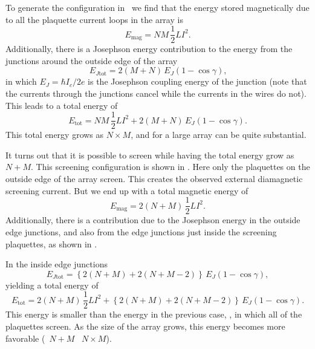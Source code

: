 %
%

To generate the configuration in
\ we find that the energy stored
magnetically due to all the plaquette current loops in the array 
is
%
\begin{equation}
E_{\mathrm{mag}} = NM\, \frac{1}{2} LI^2.
\end{equation}
%
Additionally, there is a Josephson energy contribution to the energy
from the junctions around the outside edge of the array
%
\begin{equation}
E_{J \mathrm{tot}} = 2(M+N)\, E_J (1-\cos\gamma)\mbox{,}
\end{equation}
%
in which $E_J=\hbar I_c/2 e$ is the Josephson coupling energy of the junction
(note that the currents through the junctions cancel while the currents in
the wires do not).
This leads to a total energy of 
%
\begin{equation}
E_{\mathrm{tot}} =  NM \,\frac{1}{2} LI^2 + 
          2(M+N)\, E_J (1-\cos\gamma).
\label{eqn:all_loop_screening}
\end{equation}
%
This total energy grows as $N\times M$, and for a large array can be quite 
substantial. 

It turns out that it is possible to screen while having the total
energy grow as $N+M$. 
This screening configuration is shown in 
. Here only the plaquettes on 
the outside edge of the array screen. This creates the observed external
diamagnetic screening current. But we end up with a total magnetic
energy of 
%
\begin{equation}
E_{\mathrm{mag}} = 2(N+M)\, \frac{1}{2} LI^2.
\end{equation}
% 
Additionally, there is a contribution due to the Josephson energy
in the outside edge junctions, and also from the edge 
junctions just inside the screening plaquettes, as shown in 
. 

In the inside edge junctions
%
\begin{equation}
E_{J \mathrm{tot}} 
=\left\{ 2(N+M) + 2(N + M - 2) \right\}\, E_J (1-\cos\gamma),
\end{equation}
%
yielding a total energy of 
%
\begin{equation}
E_{\mathrm{tot}} = 2(N+M)\, \frac{1}{2} LI^2 +
 \left\{ 2(N+M) + 2(N + M - 2) \right\}\, E_J (1-\cos\gamma).
\label{eqn:edge_loop_screening}
\end{equation}
%
This energy is smaller than the energy in the previous case,
,
in which all of the plaquettes screen. As the size of the array
grows, this energy becomes more favorable (\cf\ $N+M$ \vs\ $N\times M$).

